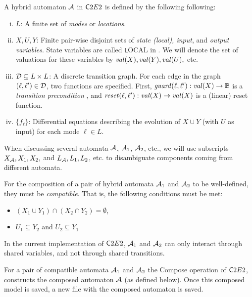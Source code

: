 \documentclass{tufte-book} %
\begin{document}
A hybrid automaton $\mathcal{A}$ in ${{\mathsf C2E2}}$ is defined by the following following: 
\begin{enumerate}[(i)]
\item $L$: A finite set of {\em modes} or {\em locations}.
\item $X,U,Y$: Finite pair-wise disjoint sets of {\em state (local), input}, and {\em output variables}. State variables are called {\texttt LOCAL} in \hyxml.
We will denote the  set of valuations for these variables by ${\mathit{val}(X)}, {\mathit{val}(Y)}, {\mathit{val}(U)},$ etc.
%
%
\item $\mathcal{D} \subseteq L \times L$: A discrete transition graph. For each edge in the graph $(\ell,\ell') \in \mathcal{D}$, two functions are specified. First, ${\mathit{guard}}(\ell,\ell'):{\mathit{val}(X)} \rightarrow {\mathbb{B}}$ is a {\em transition precondition \/}, and 
${\mathit{reset}}(\ell,\ell'): {\mathit{val}(X)} \rightarrow {\mathit{val}(X)}$ is a (linear) reset function.
\item $\{f_{\ell}\}$: Differential equations describing the evolution of $X \cup Y$ (with $U$ as input) for each mode $\ell \in L$.
\end{enumerate}
When discussing several automata $\mathcal{A}$, $\mathcal{A}_1$, $\mathcal{A}_2$, etc., we will use subscripts $X_{\mathcal{A}}, X_1, X_2,$ and $L_{\mathcal{A}}, L_1, L_2$, etc. to disambiguate components coming from different automata.

For the composition of a pair of hybrid automata $\mathcal{A}_1$ and $\mathcal{A}_2$ to be well-defined, they must be {\em compatible\/}. That is, the following conditions must be met:
\begin{itemize}
    \item $(X_1 \cup Y_1) \cap (X_2 \cap Y_2) = \emptyset$,
    \item $U_1 \subseteq Y_2$ and $U_2 \subseteq Y_1$ 
\end{itemize}
In the current implementation of ${{\mathsf C2E2}}$, $\mathcal{A}_1$ and $\mathcal{A}_2$ can only interact through shared variables, and not through shared transitions.

For a pair of compatible automata $\mathcal{A}_1$ and $\mathcal{A}_2$ the {\sf Compose\/} operation of ${{\mathsf C2E2}}$, constructs the composed automaton $\mathcal{A}$ (as defined below). Once this composed model is saved, a new \hyxml file with the composed automaton is saved.
\end{document}

